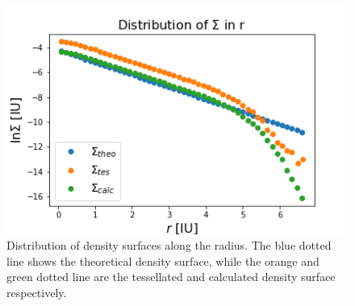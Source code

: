 \documentclass{aa}
\begin{document}
   
   \begin{figure}[h]
   \includegraphics[scale=0.55]{Distribution_sigma_par_tot.png}
   \caption{Distribution of density surfaces along the radius. The blue dotted line shows the theoretical density surface, while the orange and green dotted line are the tessellated and calculated density surface respectively.}
   \centering
   \label{fig:boat1}
   \end{figure}
   
\end{document}
